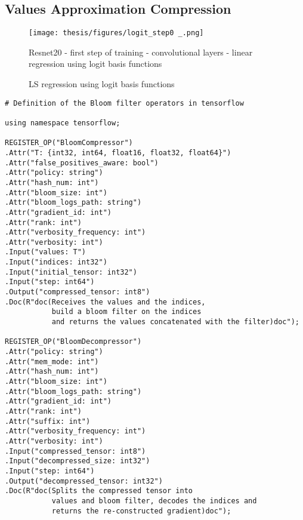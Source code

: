 \documentclass[preface]{dithesis}
\begin{document}
\begin{appendix}
\appendixstartedtrue

{}

\chapter{Values Approximation Compression}

\begin{figure}[h]
\centering
\texttt{[image: thesis/figures/logit\_step0 \_.png]}
\caption{LS regression using logit basis functions}
\medskip
\small
Resnet20 - first step of training - convolutional layers - linear regression using logit basis functions
\label{regressor}
\end{figure}

\newpage

\begin{lstlisting}
# Definition of the Bloom filter operators in tensorflow

using namespace tensorflow;

REGISTER_OP("BloomCompressor")
.Attr("T: {int32, int64, float16, float32, float64}")
.Attr("false_positives_aware: bool")
.Attr("policy: string")
.Attr("hash_num: int")
.Attr("bloom_size: int")
.Attr("bloom_logs_path: string")
.Attr("gradient_id: int")
.Attr("rank: int")
.Attr("verbosity_frequency: int")
.Attr("verbosity: int")
.Input("values: T")
.Input("indices: int32")
.Input("initial_tensor: int32")
.Input("step: int64")
.Output("compressed_tensor: int8")
.Doc(R"doc(Receives the values and the indices, 
           build a bloom filter on the indices 
           and returns the values concatenated with the filter)doc");

REGISTER_OP("BloomDecompressor")
.Attr("policy: string")
.Attr("mem_mode: int")
.Attr("hash_num: int")
.Attr("bloom_size: int")
.Attr("bloom_logs_path: string")
.Attr("gradient_id: int")
.Attr("rank: int")
.Attr("suffix: int")
.Attr("verbosity_frequency: int")
.Attr("verbosity: int")
.Input("compressed_tensor: int8")
.Input("decompressed_size: int32")
.Input("step: int64")
.Output("decompressed_tensor: int32")
.Doc(R"doc(Splits the compressed tensor into 
           values and bloom filter, decodes the indices and 
           returns the re-constructed gradient)doc");

\end{lstlisting}

\end{appendix}


\end{document}
